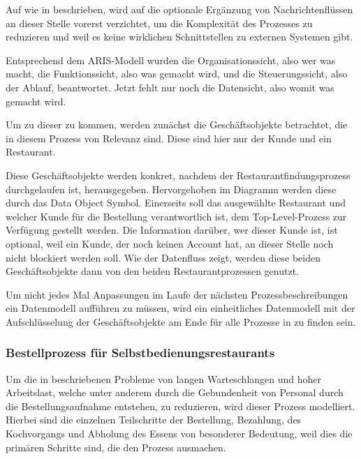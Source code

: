 Auf wie in  beschrieben, wird auf die optionale Ergänzung von Nachrichtenflüssen an dieser Stelle vorerst verzichtet, um die Komplexität des Prozesses zu reduzieren und weil es keine wirklichen Schnittstellen zu externen Systemen gibt.

Entsprechend dem ARIS-Modell wurden die Organisationssicht, also wer was macht, die Funktionssicht, also was gemacht wird, und die Steuerungssicht, also der Ablauf, beantwortet. Jetzt fehlt nur noch die Datensicht, also womit was gemacht wird. \citep[vgl.][]{lackes_aris_2025}

Um zu dieser zu kommen, werden zunächst die Geschäftsobjekte betrachtet, die in diesem Prozess von Relevanz sind. Diese sind hier nur der Kunde und ein Restaurant.

Diese Geschäftsobjekte werden konkret, nachdem der Restaurantfindungsprozess durchgelaufen ist, herausgegeben. Hervorgehoben im Diagramm werden diese durch das Data Object Symbol. Einerseits soll das ausgewählte Restaurant und welcher Kunde für die Bestellung verantwortlich ist, dem Top-Level-Prozess zur Verfügung gestellt werden. Die Information darüber, wer dieser Kunde ist, ist optional, weil ein Kunde, der noch keinen Account hat, an dieser Stelle noch nicht blockiert werden soll. Wie der Datenfluss zeigt, werden diese beiden Geschäftsobjekte dann von den beiden Restaurantprozessen genutzt.

Um nicht jedes Mal Anpassungen im Laufe der nächsten Prozessbeschreibungen ein Datenmodell aufführen zu müssen, wird ein einheitliches Datenmodell mit der Aufschlüsselung der Geschäftsobjekte am Ende für alle Prozesse in  zu finden sein.

\subsubsection{Bestellprozess für Selbstbedienungsrestaurants}
\label{sec:selbstbedienungsrestaurantunterprozess}
Um die in  beschriebenen Probleme von langen Warteschlangen und hoher Arbeitslast, welche unter anderem durch die Gebundenheit von Personal durch die Bestellungsaufnahme entstehen, zu reduzieren, wird dieser Prozess modelliert. Hierbei sind die einzelnen Teilschritte der Bestellung, Bezahlung, des Kochvorgangs und Abholung des Essens von besonderer Bedeutung, weil dies die primären Schritte sind, die den Prozess ausmachen.

